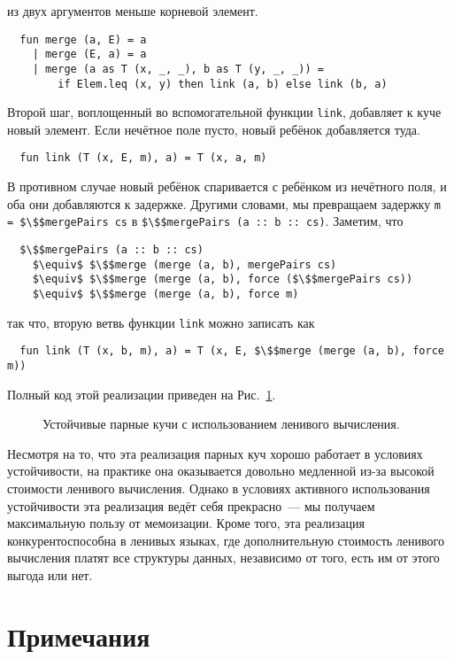 из двух аргументов меньше корневой элемент.
\begin{lstlisting}
  fun merge (a, E) = a
    | merge (E, a) = a
    | merge (a as T (x, _, _), b as T (y, _, _)) =
        if Elem.leq (x, y) then link (a, b) else link (b, a)
\end{lstlisting}
Второй шаг, воплощенный во вспомогательной функции \lstinline!link!,
добавляет к куче новый элемент. Если нечётное поле пусто, новый
ребёнок добавляется туда.
\begin{lstlisting}
  fun link (T (x, E, m), a) = T (x, a, m)
\end{lstlisting}
В противном случае новый ребёнок спаривается с ребёнком из нечётного
поля, и оба они добавляются к задержке. Другими словами, мы превращаем
задержку \lstinline!m = $\$$mergePairs cs! в
\lstinline!$\$$mergePairs (a :: b :: cs)!. Заметим, что
\begin{lstlisting}
  $\$$mergePairs (a :: b :: cs)
    $\equiv$ $\$$merge (merge (a, b), mergePairs cs)
    $\equiv$ $\$$merge (merge (a, b), force ($\$$mergePairs cs))
    $\equiv$ $\$$merge (merge (a, b), force m)
\end{lstlisting}
так что, вторую ветвь функции \lstinline!link! можно записать как
\begin{lstlisting}
  fun link (T (x, b, m), a) = T (x, E, $\$$merge (merge (a, b), force m))
\end{lstlisting}
Полный код этой реализации приведен на Рис.~\ref{fig:6.6}.

\begin{figure}
  \centering

  \caption{Устойчивые парные кучи с использованием ленивого вычисления.}
  \label{fig:6.6}
\end{figure}

\begin{hint}
  Несмотря на то, что эта реализация парных куч хорошо работает в условиях
  устойчивости, на практике она оказывается довольно
  медленной из-за высокой стоимости ленивого вычисления. Однако в
  условиях активного использования устойчивости эта реализация
  ведёт себя прекрасно~--- мы получаем максимальную пользу от
  мемоизации. Кроме того, эта реализация конкурентоспособна в ленивых
  языках, где дополнительную стоимость ленивого вычисления платят все
  структуры данных, независимо от того, есть им от этого выгода или нет.
\end{hint}

\section{Примечания}
\label{sc:6.6}

